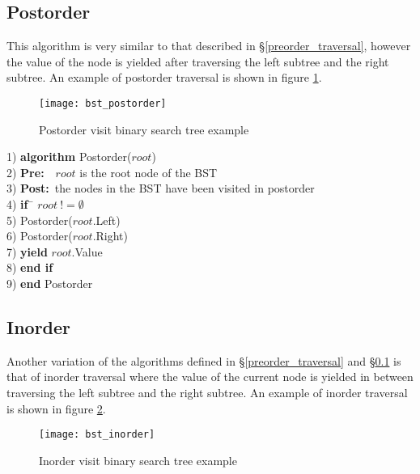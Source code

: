 \subsection{Postorder} \label{postorder_traversal}
This algorithm is very similar to that described in \S\ref{preorder_traversal}, however the value of the node is yielded after traversing the left subtree and  the right subtree. An example of postorder traversal is shown in figure \ref{fig:bst_postorder}.

\begin{figure}[htp]
\begin{center}
\texttt{[image: bst\_postorder]}
\end{center}
\caption{Postorder visit binary search tree example} \label{fig:bst_postorder}
\end{figure}

\begin{tabbing}
1)  \textbf{alg}\= \textbf{orithm} Postorder($root$) \\
2)  \> \textbf{Pre:}~~$root$ is the root node of the BST \\
3)  \> \textbf{Post:}~the nodes in the BST have been visited in postorder \\
4)  \> \textbf{if}~\= $root~!= \emptyset$ \\
5)  \> \> Postorder($root$.Left) \\
6)  \> \> Postorder($root$.Right) \\
7)  \> \> \textbf{yield} $root$.Value \\
8)  \> \textbf{end if} \\
9)  \textbf{end} Postorder \\
\end{tabbing}

\subsection{Inorder}
Another variation of the algorithms defined in \S\ref{preorder_traversal} and \S\ref{postorder_traversal} is that of inorder traversal where the value of the current node is yielded in between traversing the left subtree and  the right subtree. An example of inorder traversal is shown in figure \ref{fig:bst_inorder}.

\begin{figure}[htp]
\begin{center}
\texttt{[image: bst\_inorder]}
\end{center}
\caption{Inorder visit binary search tree example} \label{fig:bst_inorder}
\end{figure}


